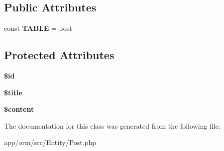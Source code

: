 \subsection*{Public Attributes}
\begin{DoxyCompactItemize}
\item 
const {\bfseries T\+A\+B\+LE} = \textquotesingle{}post\textquotesingle{}\hypertarget{classORM_1_1Entity_1_1Post_af42a28989e17709a08106c57b6cb2f4c}{}\label{classORM_1_1Entity_1_1Post_af42a28989e17709a08106c57b6cb2f4c}

\end{DoxyCompactItemize}
\subsection*{Protected Attributes}
\begin{DoxyCompactItemize}
\item 
{\bfseries \$id}\hypertarget{classORM_1_1Entity_1_1Post_af60076c67953553bac9cde5a24247892}{}\label{classORM_1_1Entity_1_1Post_af60076c67953553bac9cde5a24247892}

\item 
{\bfseries \$title}\hypertarget{classORM_1_1Entity_1_1Post_a97fcb96648ad219d0e928b6545fe28bb}{}\label{classORM_1_1Entity_1_1Post_a97fcb96648ad219d0e928b6545fe28bb}

\item 
{\bfseries \$content}\hypertarget{classORM_1_1Entity_1_1Post_a1846e68b722e1abc0d18c79d1dfeb53f}{}\label{classORM_1_1Entity_1_1Post_a1846e68b722e1abc0d18c79d1dfeb53f}

\end{DoxyCompactItemize}


The documentation for this class was generated from the following file\+:\begin{DoxyCompactItemize}
\item 
app/orm/src/\+Entity/Post.\+php\end{DoxyCompactItemize}
